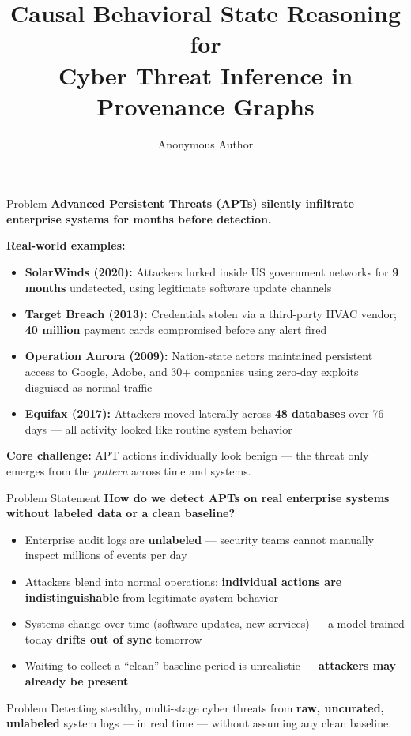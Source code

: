 \documentclass[aspectratio=169]{beamer}
\title{Causal Behavioral State Reasoning for\\Cyber Threat Inference in Provenance Graphs}
\author{Anonymous Author}
\institute{Anonymous Affiliation}
\date{}
\begin{document}
\begin{frame}[plain]
  \titlepage
\end{frame}

\begin{frame}{Problem}
  \textbf{Advanced Persistent Threats (APTs) silently infiltrate enterprise systems for months before detection.}

  \vspace{0.8em}
  \textbf{Real-world examples:}
  \begin{itemize}
    \item \textbf{SolarWinds (2020):} Attackers lurked inside US government networks for \textbf{9 months} undetected, using legitimate software update channels
    \item \textbf{Target Breach (2013):} Credentials stolen via a third-party HVAC vendor; \textbf{40 million} payment cards compromised before any alert fired
    \item \textbf{Operation Aurora (2009):} Nation-state actors maintained persistent access to Google, Adobe, and 30+ companies using zero-day exploits disguised as normal traffic
    \item \textbf{Equifax (2017):} Attackers moved laterally across \textbf{48 databases} over 76 days — all activity looked like routine system behavior
  \end{itemize}

  \vspace{0.6em}
  \textbf{Core challenge:} APT actions individually look benign — the threat only emerges from the \textit{pattern} across time and systems.
\end{frame}

\begin{frame}{Problem Statement}
  \textbf{How do we detect APTs on real enterprise systems without labeled data or a clean baseline?}

  \vspace{0.8em}
  \begin{itemize}
    \item Enterprise audit logs are \textbf{unlabeled} — security teams cannot manually inspect millions of events per day
    \item Attackers blend into normal operations; \textbf{individual actions are indistinguishable} from legitimate system behavior
    \item Systems change over time (software updates, new services) — a model trained today \textbf{drifts out of sync} tomorrow
    \item Waiting to collect a ``clean'' baseline period is unrealistic — \textbf{attackers may already be present}
  \end{itemize}

  \vspace{0.6em}
  \begin{block}{Problem}
    Detecting stealthy, multi-stage cyber threats from \textbf{raw, uncurated, unlabeled} system logs — in real time — without assuming any clean baseline.
  \end{block}
\end{frame}
\end{document}
